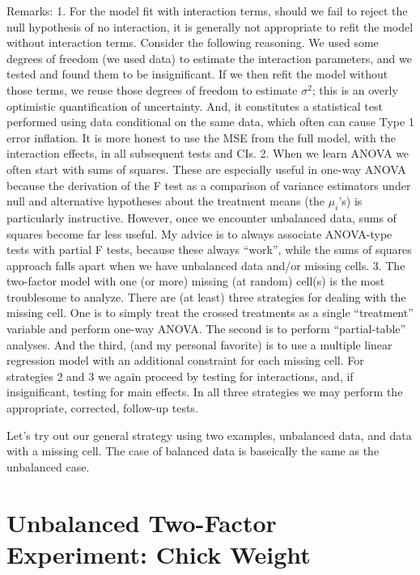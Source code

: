\documentclass[
]{book}
\begin{document}
Remarks:
1. For the model fit with interaction terms, should we fail to reject the null hypothesis of no interaction, it is generally not appropriate to refit the model without interaction terms. Consider the following reasoning. We used some degrees of freedom (we used data) to estimate the interaction parameters, and we tested and found them to be insignificant. If we then refit the model without those terms, we reuse those degrees of freedom to estimate \(\sigma^2\); this is an overly optimistic quantification of uncertainty. And, it constitutes a statistical test performed using data conditional on the same data, which often can cause Type 1 error inflation. It is more honest to use the MSE from the full model, with the interaction effects, in all subsequent tests and CIs.
2. When we learn ANOVA we often start with sums of squares. These are especially useful in one-way ANOVA because the derivation of the F test as a comparison of variance estimators under null and alternative hypotheses about the treatment means (the \(\mu_i\)'s) is particularly instructive. However, once we encounter unbalanced data, sums of squares become far less useful. My advice is to always associate ANOVA-type tests with partial F tests, because these always ``work'', while the sums of squares approach falls apart when we have unbalanced data and/or missing cells.
3. The two-factor model with one (or more) missing (at random) cell(s) is the most troublesome to analyze. There are (at least) three strategies for dealing with the missing cell. One is to simply treat the crossed treatments as a single ``treatment'' variable and perform one-way ANOVA. The second is to perform ``partial-table'' analyses. And the third, (and my personal favorite) is to use a multiple linear regression model with an additional constraint for each missing cell. For strategies 2 and 3 we again proceed by testing for interactions, and, if insignificant, testing for main effects. In all three strategies we may perform the appropriate, corrected, follow-up tests.

Let's try out our general strategy using two examples, unbalanced data, and data with a missing cell. The case of balanced data is baseically the same as the unbalanced case.

\hypertarget{unbalanced-two-factor-experiment-chick-weight}{%
\section{Unbalanced Two-Factor Experiment: Chick Weight}\label{unbalanced-two-factor-experiment-chick-weight}}
\end{document}
